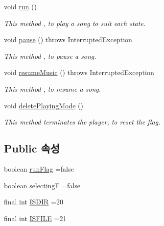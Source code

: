 \begin{DoxyCompactItemize}
void \hyperlink{classkr_1_1ac_1_1kookmin_1_1cs_1_1music_1_1_music_player_a79e3e5a9b9d94b7f6a090687d8690803}{run} ()
\begin{DoxyCompactList}\small\item\em This method , to play a song to suit each state. \end{DoxyCompactList}\item 
void \hyperlink{classkr_1_1ac_1_1kookmin_1_1cs_1_1music_1_1_music_player_ae71b11199920715b81a50122bb4d9e9d}{pause} ()  throws Interrupted\+Exception
\begin{DoxyCompactList}\small\item\em This method , to pause a song. \end{DoxyCompactList}\item 
void \hyperlink{classkr_1_1ac_1_1kookmin_1_1cs_1_1music_1_1_music_player_a889d56a689747ddb862ae3a76f682803}{resume\+Music} ()  throws Interrupted\+Exception
\begin{DoxyCompactList}\small\item\em This method , to resume a song. \end{DoxyCompactList}\item 
void \hyperlink{classkr_1_1ac_1_1kookmin_1_1cs_1_1music_1_1_music_player_a0dd8bf2b710c07fa45a75f725786e8ca}{delete\+Playing\+Mode} ()
\begin{DoxyCompactList}\small\item\em This method terminates the player, to reset the flag. \end{DoxyCompactList}\end{DoxyCompactItemize}
\subsection*{Public 속성}
\begin{DoxyCompactItemize}
\item 
boolean \hyperlink{classkr_1_1ac_1_1kookmin_1_1cs_1_1music_1_1_music_player_a22eec123640d135ac5ad319b2a05d8e6}{run\+Flag} =false
\item 
boolean \hyperlink{classkr_1_1ac_1_1kookmin_1_1cs_1_1music_1_1_music_player_a84e908ec2c02aac3801492aed4d1ae8a}{selecting\+F} =false
\item 
final int \hyperlink{classkr_1_1ac_1_1kookmin_1_1cs_1_1music_1_1_music_player_a56a46a09a7d67269c10a3f1284da0140}{I\+S\+D\+I\+R} =20
\item 
final int \hyperlink{classkr_1_1ac_1_1kookmin_1_1cs_1_1music_1_1_music_player_a64d4cdb74ae72282cf0b345a3b9667d2}{I\+S\+F\+I\+L\+E} =21
\end{DoxyCompactItemize}
